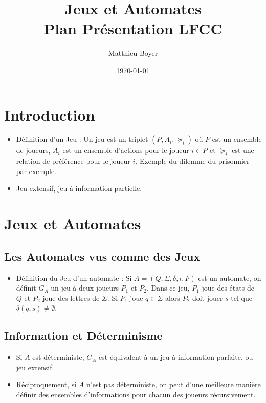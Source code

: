 \documentclass{cours}
\title{Jeux et Automates\\ \small Plan Présentation LFCC}
\author{Matthieu Boyer}
\date{\today}
\begin{document}
\section*{Introduction}
\begin{itemize}
    \item Définition d'un Jeu : Un jeu est un triplet $\left(P, A_{i}, \succeq_{i}\right)$ où $P$ est un ensemble de joueurs, $A_{i}$ est un ensemble d'actions pour le joueur $i \in P$ et $\succeq_{i}$ est une relation de préférence pour le joueur $i$. Exemple du dilemme du prisonnier par exemple.
    \item Jeu extensif, jeu à information partielle.
\end{itemize}

\section{Jeux et Automates}
\subsection{Les Automates vus comme des Jeux}
\begin{itemize}
    \item Définition du Jeu d'un automate : Si $A = \left(Q, \Sigma, \delta, \iota, F\right)$ est un automate, on définit $G_{A}$ un jeu à deux joueurs $P_{1}$ et $P_{2}$. Dans ce jeu, $P_{1}$ joue des états de $Q$ et $P_{2}$ joue des lettres de $\Sigma$. Si $P_{1}$ joue $q \in \Sigma$ alors $P_{2}$ doit jouer $s$ tel que $\delta(q, s) \neq \emptyset$.
\end{itemize}

\subsection{Information et Déterminisme}
\begin{itemize}
    \item Si $A$ est déterministe, $G_{A}$ est équivalent à un jeu à information parfaite, ou jeu extensif.
    \item Réciproquement, si $A$ n'est pas déterministe, on peut d'une meilleure manière définir des ensembles d'informations pour chacun des joueurs récursivement.
\end{itemize}
\end{document}
